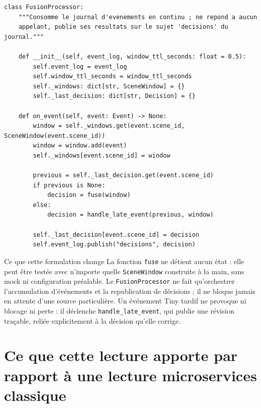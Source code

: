 \documentclass[11pt,a4paper]{article}
\begin{document}
\begin{lstlisting}[style=python, caption={Fusion comme réduction fonctionnelle sur une fenêtre d'événements}]
class FusionProcessor:
    """Consomme le journal d'evenements en continu ; ne repond a aucun
    appelant, publie ses resultats sur le sujet 'decisions' du journal."""

    def __init__(self, event_log, window_ttl_seconds: float = 0.5):
        self.event_log = event_log
        self.window_ttl_seconds = window_ttl_seconds
        self._windows: dict[str, SceneWindow] = {}
        self._last_decision: dict[str, Decision] = {}

    def on_event(self, event: Event) -> None:
        window = self._windows.get(event.scene_id, SceneWindow(event.scene_id))
        window = window.add(event)
        self._windows[event.scene_id] = window

        previous = self._last_decision.get(event.scene_id)
        if previous is None:
            decision = fuse(window)
        else:
            decision = handle_late_event(previous, window)

        self._last_decision[event.scene_id] = decision
        self.event_log.publish("decisions", decision)
\end{lstlisting}

\begin{correction}{Ce que cette formulation change}
La fonction \texttt{fuse} ne détient aucun état : elle peut être testée avec n'importe quelle
\texttt{SceneWindow} construite à la main, sans mock ni configuration préalable. Le
\texttt{FusionProcessor} ne fait qu'orchestrer l'accumulation d'événements et la republication
de décisions ; il ne bloque jamais en attente d'une source particulière. Un événement Tiny
tardif ne provoque ni blocage ni perte : il déclenche \texttt{handle\_late\_event}, qui publie
une révision traçable, reliée explicitement à la décision qu'elle corrige.
\end{correction}

\section{Ce que cette lecture apporte par rapport à une lecture microservices classique}
\end{document}

